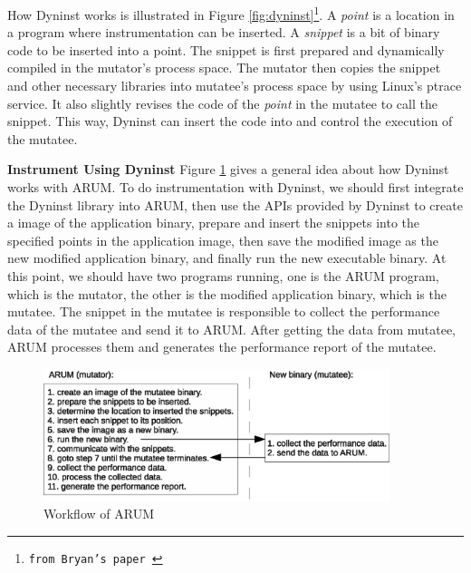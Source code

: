 \documentclass[11pt,letterpaper,oneside]{article}
\begin{document}
How Dyninst works is illustrated in Figure \ref{fig:dyninst}\footnote{\texttt{from Bryan's paper \cite{bib:anapi}}}. A \emph{point} is a location in a program where instrumentation can be inserted. A \emph{snippet} is a bit of binary code to be inserted into a point. The snippet is first prepared and dynamically compiled in the mutator's process space. The mutator then copies the snippet and other necessary libraries into mutatee's process space by using Linux's ptrace service. It also slightly revises the code of the \emph{point} in the mutatee to call the snippet. This way, Dyninst can insert the code into and control the execution of the mutatee.

\noindent \newline\textbf{Instrument Using Dyninst}\newline
\indent Figure \ref{fig:workflow} gives a general idea about how Dyninst works with ARUM. To do instrumentation with Dyninst, we should first integrate the Dyninst library into ARUM, then use the APIs provided by Dyninst to create a image of the application binary, prepare and insert the snippets into the specified points in the application image, then save the modified image as the new modified application binary, and finally run the new executable binary. At this point, we should have two programs running, one is the ARUM program, which is the mutator, the other is the modified application binary, which is the mutatee. The snippet in the mutatee is responsible to collect the performance data of the mutatee and send it to ARUM. After getting the data from mutatee, ARUM processes them and generates the performance report of the mutatee.

\begin{figure}
\begin{center}
\includegraphics[width=0.9\textwidth]{workflow.eps}
\caption{Workflow of ARUM}
\label{fig:workflow}
\end{center}
\end{figure}
\end{document}
